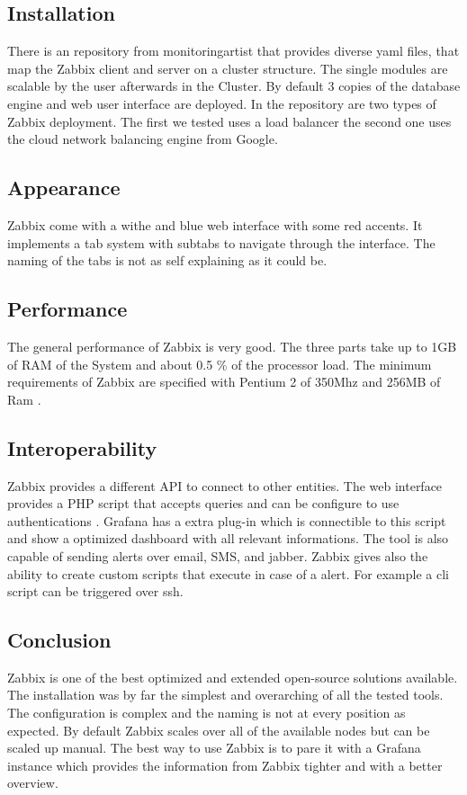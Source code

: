 \subsection{Installation}
There is an repository from monitoringartist \cite{zabbix_kube} that provides diverse yaml files, that map the Zabbix client and server on a cluster structure. The single modules are scalable by the user afterwards in the Cluster. By default 3 copies of the database engine and web user interface are deployed. In the repository are two types of Zabbix deployment. The first we tested uses a load balancer the second one uses the cloud network balancing engine from Google.
\subsection{Appearance}%
Zabbix come with a withe and blue web interface with some red accents. It implements a tab system with subtabs to navigate through the interface. The naming of the tabs is not as self explaining as it could be.  
\subsection{Performance}
The general performance of Zabbix is very good. The three parts take up to 1GB of RAM of the System and about 0.5 \% of the processor load. The minimum requirements of Zabbix are specified with Pentium 2 of 350Mhz and 256MB of Ram \cite{Marik2014}.
\subsection{Interoperability}
Zabbix provides a different API to connect to other entities. The web interface  provides a PHP script that accepts queries and can be configure to use authentications . Grafana has a extra plug-in which is connectible to this script and show a optimized dashboard with all relevant informations. The tool is also capable of sending alerts over email, SMS, and jabber. Zabbix gives also the ability to create custom scripts that execute in case of a alert. For example a cli script can be triggered over ssh. 
\subsection{Conclusion}
Zabbix is one of the best optimized and extended open-source solutions available. The installation was by far the simplest and overarching of all the tested tools. The configuration is complex and the naming is not at every position as expected. By default Zabbix scales over all of the available nodes but can be scaled up manual. The best way to use Zabbix is to pare it with a Grafana instance which provides the information from Zabbix tighter and with a better overview.

